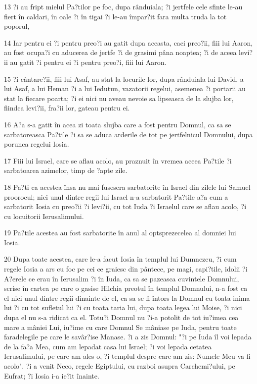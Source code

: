 \par 13 ?i au fript mielul Pa?tilor pe foc, dupa rânduiala; ?i jertfele cele sfinte le-au fiert în caldari, în oale ?i în tigai ?i le-au împar?it fara multa truda la tot poporul,
\par 14 Iar pentru ei ?i pentru preo?i au gatit dupa aceasta, caci preo?ii, fiii lui Aaron, au fost ocupa?i cu aducerea de jertfe ?i de grasimi pâna noaptea; ?i de aceea levi?ii au gatit ?i pentru ei ?i pentru preo?i, fiii lui Aaron.
\par 15 ?i cântare?ii, fiii lui Asaf, au stat la locurile lor, dupa rânduiala lui David, a lui Asaf, a lui Heman ?i a lui Iedutun, vazatorii regelui, asemenea ?i portarii au stat la fiecare poarta; ?i ei nici nu aveau nevoie sa lipseasca de la slujba lor, fiindca levi?ii, fra?ii lor, gateau pentru ei.
\par 16 A?a s-a gatit în acea zi toata slujba care a fost pentru Domnul, ca sa se sarbatoreasca Pa?tile ?i sa se aduca arderile de tot pe jertfelnicul Domnului, dupa porunca regelui Iosia.
\par 17 Fiii lui Israel, care se aflau acolo, au praznuit în vremea aceea Pa?tile ?i sarbatoarea azimelor, timp de ?apte zile.
\par 18 Pa?ti ca acestea însa nu mai fusesera sarbatorite în Israel din zilele lui Samuel proorocul; nici unul dintre regii lui Israel n-a sarbatorit Pa?tile a?a cum a sarbatorit Iosia cu preo?ii ?i levi?ii, cu tot Iuda ?i Israelul care se aflau acolo, ?i cu locuitorii Ierusalimului.
\par 19 Pa?tile acestea au fost sarbatorite în anul al optsprezecelea al domniei lui Iosia.
\par 20 Dupa toate acestea, care le-a facut Iosia în templul lui Dumnezeu, ?i cum regele Iosia a ars cu foc pe cei ce graiesc din pântece, pe magi, capi?tile, idolii ?i A?erele ce erau în Ierusalim ?i în Iuda, ca sa se pazeasca cuvintele Domnului, scrise în cartea pe care o gasise Hilchia preotul în templul Domnului, n-a fost ca el nici unul dintre regii dinainte de el, ca sa se fi întors la Domnul cu toata inima lui ?i cu tot sufletul lui ?i cu toata taria lui, dupa toata legea lui Moise, ?i nici dupa el nu s-a ridicat ca el. Totu?i Domnul nu ?i-a potolit de tot iu?imea cea mare a mâniei Lui, iu?ime cu care Domnul Se mâniase pe Iuda, pentru toate faradelegile pe care le savâr?ise Manase. ?i a zis Domnul: "?i pe Iuda îl voi lepada de la fa?a Mea, cum am lepadat casa lui Israel; ?i voi lepada cetatea Ierusalimului, pe care am ales-o, ?i templul despre care am zis: Numele Meu va fi acolo". ?i a venit Neco, regele Egiptului, cu razboi asupra Carchemi?ului, pe Eufrat; ?i Iosia i-a ie?it înainte.
